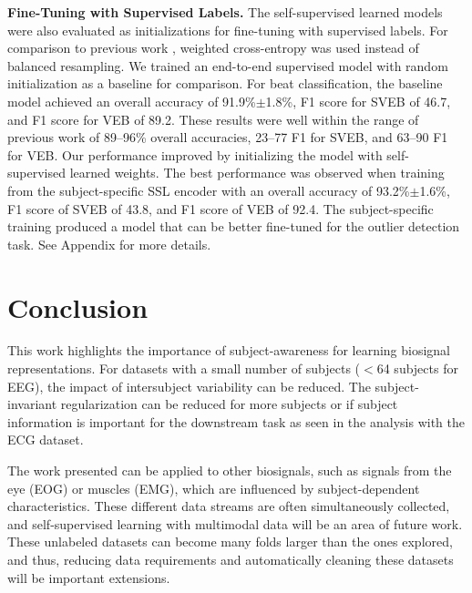 \documentclass{article}
\renewcommand{\paragraph}[1]{\textbf{#1}\hspace{1em}}
\begin{document}
\paragraph{Fine-Tuning with Supervised Labels.} The self-supervised learned
models were also evaluated as initializations for fine-tuning with supervised
labels. For comparison to previous work \cite{de_chazal_automatic_2004,huang_new_2014,garcia_inter-patient_2017,xu_towards_2019,niu_inter-patient_2019}, weighted
cross-entropy was used \cite{cui_class-balanced_2019} instead of balanced
resampling. We trained an end-to-end supervised model with random initialization
as a baseline for comparison. For beat classification, the baseline model
achieved an overall accuracy of 91.9\%$\pm$1.8\%, F1 score for SVEB of 46.7, and
F1 score for VEB of 89.2. These results were well within the range of previous
work
\cite{de_chazal_automatic_2004,huang_new_2014,garcia_inter-patient_2017,xu_towards_2019,niu_inter-patient_2019}
of 89--96\% overall accuracies, 23--77 F1 for SVEB, and 63--90 F1 for
VEB. Our performance improved by initializing the model with self-supervised
learned weights. The best performance was observed when training from the
subject-specific SSL encoder with an overall accuracy of 93.2\%$\pm$1.6\%, F1
score of SVEB of 43.8, and F1 score of VEB of 92.4. The subject-specific
training produced a model that can be better fine-tuned for the outlier
detection task. See Appendix for more details.
  

\section{Conclusion}

This work highlights the importance of subject-awareness for learning biosignal
representations. For datasets with a small number of subjects ($<$64 subjects
for EEG), the impact of intersubject variability can be reduced. The
subject-invariant regularization can be reduced for more subjects or if subject
information is important for the downstream task as seen in the analysis with
the ECG dataset.

The work presented can be applied to other biosignals, such as signals from the
eye (EOG) or muscles (EMG), which are influenced by subject-dependent
characteristics. These different data streams are often simultaneously
collected, and self-supervised learning with multimodal data will be an area of
future work. These unlabeled datasets can become many folds larger than the ones
explored, and thus, reducing data requirements and automatically cleaning these
datasets will be important extensions.
\end{document}
